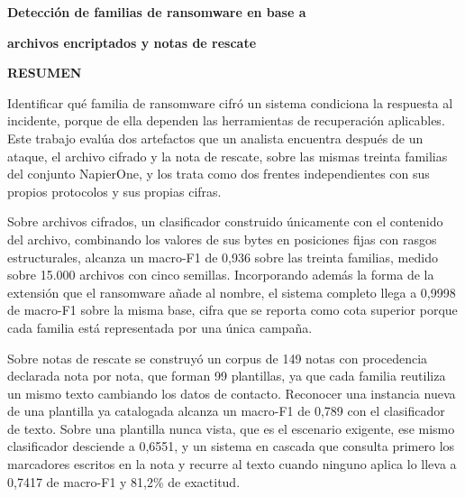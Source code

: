 \centerline{\textbf{\large Detección de familias de ransomware en base a}}
\centerline{\textbf{\large archivos encriptados y notas de rescate}}

\vspace{2cm}

\vspace{0.5cm}

\vspace{0.5cm}

\noindent
\textbf{RESUMEN}

\vspace{0.5cm}

\noindent
Identificar qué familia de ransomware cifró un sistema condiciona la respuesta al incidente, porque de ella dependen las herramientas de recuperación aplicables. Este trabajo evalúa dos artefactos que un analista encuentra después de un ataque, el archivo cifrado y la nota de rescate, sobre las mismas treinta familias del conjunto NapierOne, y los trata como dos frentes independientes con sus propios protocolos y sus propias cifras.

\vspace{0.3cm}

\noindent
Sobre archivos cifrados, un clasificador construido únicamente con el contenido del archivo, combinando los valores de sus bytes en posiciones fijas con rasgos estructurales, alcanza un macro-F1 de 0,936 sobre las treinta familias, medido sobre 15.000 archivos con cinco semillas. Incorporando además la forma de la extensión que el ransomware añade al nombre, el sistema completo llega a 0,9998 de macro-F1 sobre la misma base, cifra que se reporta como cota superior porque cada familia está representada por una única campaña.

\vspace{0.3cm}

\noindent
Sobre notas de rescate se construyó un corpus de 149 notas con procedencia declarada nota por nota, que forman 99 plantillas, ya que cada familia reutiliza un mismo texto cambiando los datos de contacto. Reconocer una instancia nueva de una plantilla ya catalogada alcanza un macro-F1 de 0,789 con el clasificador de texto. Sobre una plantilla nunca vista, que es el escenario exigente, ese mismo clasificador desciende a 0,6551, y un sistema en cascada que consulta primero los marcadores escritos en la nota y recurre al texto cuando ninguno aplica lo lleva a 0,7417 de macro-F1 y 81,2\% de exactitud.

